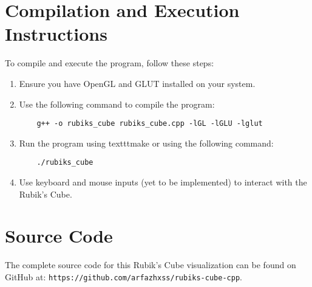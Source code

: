 \documentclass{article}
\begin{document}
\section{Compilation and Execution Instructions}
To compile and execute the program, follow these steps:
\begin{enumerate}
    \item Ensure you have OpenGL and GLUT installed on your system.
    \item Use the following command to compile the program:
    \begin{verbatim}
    g++ -o rubiks_cube rubiks_cube.cpp -lGL -lGLU -lglut
    \end{verbatim}
    \item Run the program using texttt{make} or using the following command:
    \begin{verbatim}
    ./rubiks_cube
    \end{verbatim}
    \item Use keyboard and mouse inputs (yet to be implemented) to interact with the Rubik's Cube.
\end{enumerate}

\section{Source Code}
The complete source code for this Rubik's Cube visualization can be found on GitHub at: \texttt{https://github.com/arfazhxss/rubiks-cube-cpp}.
\end{document}
